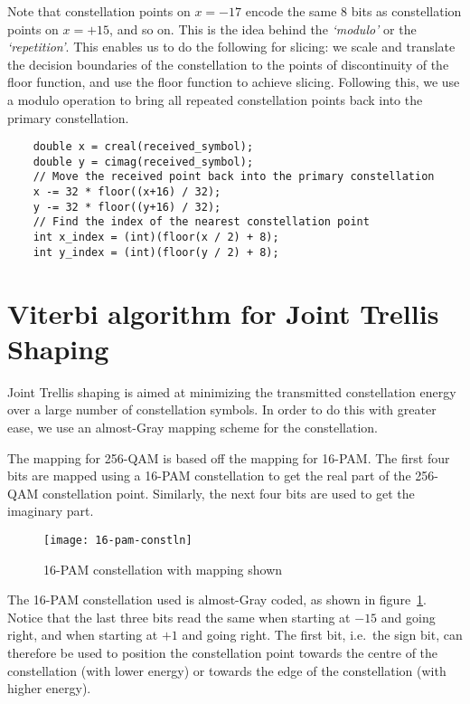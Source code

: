 Note that constellation points on $x=-17$ encode the same 8 bits as
constellation points on $x=+15$, and so on. This is the idea behind the
\emph{`modulo'} or the \emph{`repetition'}. This enables us to do the following
for slicing: we scale and translate the decision boundaries of the
constellation to the points of discontinuity of the floor function, and use the
floor function to achieve slicing. Following this, we use a modulo operation to
bring all repeated constellation points back into the primary constellation.

\begin{lstlisting}
	double x = creal(received_symbol);
	double y = cimag(received_symbol);
	// Move the received point back into the primary constellation
	x -= 32 * floor((x+16) / 32);
	y -= 32 * floor((y+16) / 32);
	// Find the index of the nearest constellation point
	int x_index = (int)(floor(x / 2) + 8);
	int y_index = (int)(floor(y / 2) + 8);
\end{lstlisting}


\section{Viterbi algorithm for Joint Trellis Shaping}

Joint Trellis shaping is aimed at minimizing the transmitted constellation
energy over a large number of constellation symbols. In order to do this with
greater ease, we use an almost-Gray mapping scheme for the constellation.

The mapping for 256-QAM is based off the mapping for 16-PAM. The first four
bits are mapped using a 16-PAM constellation to get the real part of the
256-QAM constellation point. Similarly, the next four bits are used to get the
imaginary part.

\begin{figure}[h]
	\centering
	\texttt{[image: 16-pam-constln]}
	\caption{16-PAM constellation with mapping shown}
	\label{fig:16-pam}
\end{figure}

The 16-PAM constellation used is almost-Gray coded, as shown in
figure~\ref{fig:16-pam}. Notice that the last three bits read the same when
starting at $-15$ and going right, and when starting at $+1$ and going right.
The first bit, i.e.\ the sign bit, can therefore be used to position the
constellation point towards the centre of the constellation (with lower energy)
or towards the edge of the constellation (with higher energy).

